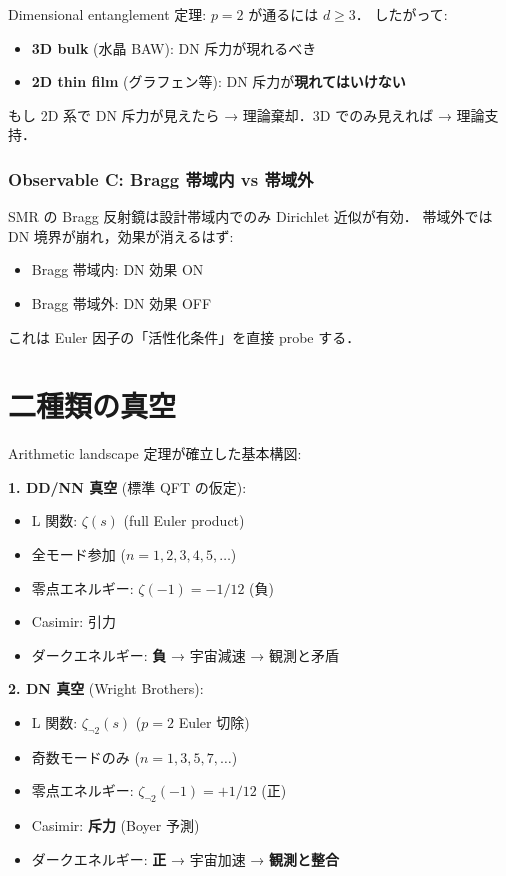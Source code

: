 \documentclass[11pt,a4paper]{article}
\begin{document}
Dimensional entanglement 定理: $p=2$ が通るには $d \geq 3$．
したがって:
\begin{itemize}
\item \textbf{3D bulk} (水晶 BAW): DN 斥力が現れるべき
\item \textbf{2D thin film} (グラフェン等): DN 斥力が\textbf{現れてはいけない}
\end{itemize}

もし 2D 系で DN 斥力が見えたら → 理論棄却．3D でのみ見えれば → 理論支持．

\subsubsection{Observable C: Bragg 帯域内 vs 帯域外}

SMR の Bragg 反射鏡は設計帯域内でのみ Dirichlet 近似が有効．
帯域外では DN 境界が崩れ，効果が消えるはず:
\begin{itemize}
\item Bragg 帯域内: DN 効果 ON
\item Bragg 帯域外: DN 効果 OFF
\end{itemize}

これは Euler 因子の「活性化条件」を直接 probe する．

\section{二種類の真空}

Arithmetic landscape 定理が確立した基本構図:

\begin{tcolorbox}[colback=blue!5,colframe=blue!50!black,title=宇宙に可能な真空は 2 種類]
\textbf{1. DD/NN 真空} (標準 QFT の仮定):
\begin{itemize}
\item L 関数: $\zeta(s)$ (full Euler product)
\item 全モード参加 ($n = 1, 2, 3, 4, 5, \ldots$)
\item 零点エネルギー: $\zeta(-1) = -1/12$ (負)
\item Casimir: 引力
\item ダークエネルギー: \textbf{負} → 宇宙減速 → 観測と矛盾
\end{itemize}

\textbf{2. DN 真空} (Wright Brothers):
\begin{itemize}
\item L 関数: $\zeta_{\neg 2}(s)$ ($p=2$ Euler 切除)
\item 奇数モードのみ ($n = 1, 3, 5, 7, \ldots$)
\item 零点エネルギー: $\zeta_{\neg 2}(-1) = +1/12$ (正)
\item Casimir: \textbf{斥力} (Boyer 予測)
\item ダークエネルギー: \textbf{正} → 宇宙加速 → \textbf{観測と整合}
\end{itemize}
\end{tcolorbox}
\end{document}
